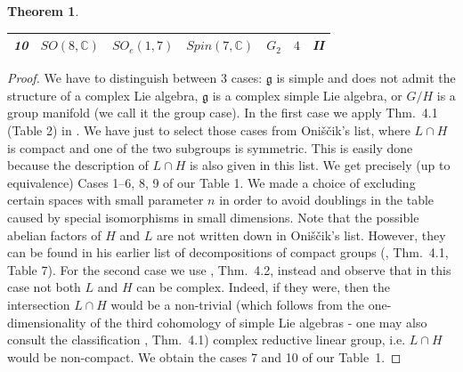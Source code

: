 \documentclass[10]{amsart}
\newtheorem{thm}{Theorem}[section]
\theoremstyle{remark}
\theoremstyle{definition}
\numberwithin{equation}{section}
\newcommand{\fg}{{\mathfrak g}}
\begin{document}
{\begin{thm}
\begin{table}[h]
\begin{center}
{\begin{tabular}{|r||l||c||c||c||c||r|}
   \hline
    \hline
    \bf 10    & $SO(8,{\mathbb C})$& $SO_e(1,7)$ & $Spin(7,{\mathbb C})$ & $G_2$ & $4$ & II \\
   \hline
\end{tabular}
}
\end{center}
\end{table}
\begin{table}[h]
\caption{Group cases}\label{foxi}
\begin{center}
\end{center}
\end{table}
%
\end{thm}
%
\begin{proof}
We have to distinguish between 3 cases: $\fg$ is simple and does not admit the structure of a complex Lie algebra, $\fg$ is a complex simple Lie algebra, or $G/H$ is a group manifold
(we call it the group case). In the first case we apply Thm.~4.1 (Table 2) in  \cite{Oni69}. We have just to select those cases from Oni\v s\v cik's list, where $L\cap H$ is compact and one of the two subgroups
is symmetric. This is easily done because the description of $L\cap H$ is also given in this list. We get precisely (up to equivalence) Cases 1--6, 8, 9 of our Table 1.
We made a choice of excluding certain spaces with small parameter $n$ in order to avoid doublings in the table caused by special isomorphisms in small dimensions.
Note that the possible abelian factors of $H$ and $L$ are not written down in Oni\v s\v cik's list. However, they can be found in his earlier list of decompositions of compact groups
(\cite{Oni62}, Thm.~4.1, Table 7). For the second case we use \cite{Oni69}, Thm.~4.2, instead and observe that in this case not both $L$ and $H$ can be complex. Indeed, if they
were, then the intersection $L\cap H$ would be a non-trivial (which follows from the one-dimensionality of the third cohomology of simple Lie algebras - one may also consult the classification \cite{Oni62}, Thm.~4.1)  complex reductive linear group, i.e. $L\cap H$ would be non-compact.
We obtain the cases 7 and 10 of our Table~1.


\end{proof}}
\end{document}
